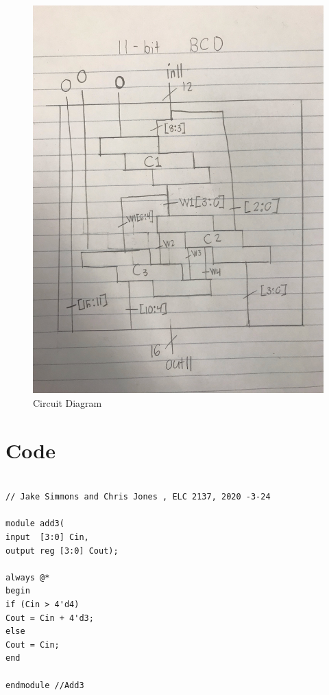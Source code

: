 \documentclass[11pt]{article}
\begin{document}
\begin{figure}[ht]\centering
	
	\includegraphics[width=1.0\textwidth]{Circuit Diagram}
	\caption{Circuit Diagram}
	\label{fig:sim_with_table}
\end{figure}
\clearpage


\section*{Code}

\begin{lstlisting}[style=Verilog,caption=Add3 Module Code,label=code:ex ]

// Jake Simmons and Chris Jones , ELC 2137, 2020 -3-24

module add3(
input  [3:0] Cin,
output reg [3:0] Cout);

always @*
begin
if (Cin > 4'd4)
Cout = Cin + 4'd3;
else
Cout = Cin;
end

endmodule //Add3


\end{lstlisting}
\end{document}
